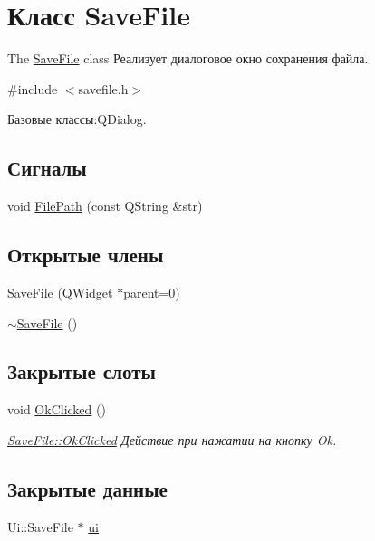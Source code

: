 \hypertarget{class_save_file}{\section{Класс Save\+File}
\label{class_save_file}
}


The \hyperlink{class_save_file}{Save\+File} class Реализует диалоговое окно сохранения файла.  




{\ttfamily \#include $<$savefile.\+h$>$}



Базовые классы\+:Q\+Dialog.

\subsection*{Сигналы}
\begin{DoxyCompactItemize}
\item 
void \hyperlink{class_save_file_a4df0bd52aab6682c0a80e47f1e66f9db}{File\+Path} (const Q\+String \&str)
\end{DoxyCompactItemize}
\subsection*{Открытые члены}
\begin{DoxyCompactItemize}
\item 
\hyperlink{class_save_file_a6b41835ff1cd13b9f81f0470f189acaa}{Save\+File} (Q\+Widget $\ast$parent=0)
\item 
\hyperlink{class_save_file_af144af2e58780d777827c9d705e44daa}{$\sim$\+Save\+File} ()
\end{DoxyCompactItemize}
\subsection*{Закрытые слоты}
\begin{DoxyCompactItemize}
\item 
void \hyperlink{class_save_file_a74a877a8da4af716b28bd85ade6307ca}{Ok\+Clicked} ()
\begin{DoxyCompactList}\small\item\em \hyperlink{class_save_file_a74a877a8da4af716b28bd85ade6307ca}{Save\+File\+::\+Ok\+Clicked} Действие при нажатии на кнопку Ok. \end{DoxyCompactList}\end{DoxyCompactItemize}
\subsection*{Закрытые данные}
\begin{DoxyCompactItemize}
\item 
Ui\+::\+Save\+File $\ast$ \hyperlink{class_save_file_a9ee717810fa8bfb5235bdf7c65280b73}{ui}
\end{DoxyCompactItemize}


